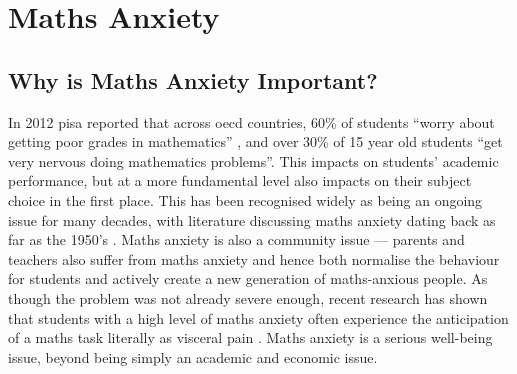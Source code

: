 \documentclass[twoside,12pt,a4paper]{report}
\begin{document}





\section{Maths Anxiety}


\subsection*{Why is Maths Anxiety Important?}

In 2012 \gls{pisa} reported that across \gls{oecd} countries, 60\% of students ``worry about getting poor grades in mathematics''  \cite{PISA2013}, and over 30\% of 15 year old students ``get very nervous doing mathematics problems''. This impacts on students' academic performance, but at a more fundamental level also impacts on their subject choice in the first place. This has been recognised widely as being an ongoing issue for many decades, with literature discussing maths anxiety dating back as far as the 1950's \cite{Dreger1957}. Maths anxiety is also a community issue --- parents and teachers also suffer from maths anxiety and hence both normalise the behaviour for students and actively create a new generation of maths-anxious people. As though the problem was not already severe enough, recent research has shown that students with a high level of maths anxiety often experience the anticipation of a maths task literally as visceral pain \cite{Lyons2012pain}. Maths anxiety is a serious well-being issue, beyond being simply an academic and economic issue.
\end{document}
